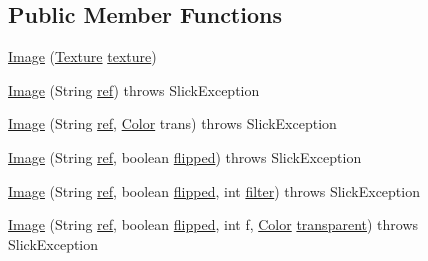 \subsection*{Public Member Functions}
\begin{DoxyCompactItemize}
\item 
\mbox{\hyperlink{classorg_1_1newdawn_1_1slick_1_1_image_a637c81c808dead29cf487b79445a4364}{Image}} (\mbox{\hyperlink{interfaceorg_1_1newdawn_1_1slick_1_1opengl_1_1_texture}{Texture}} \mbox{\hyperlink{classorg_1_1newdawn_1_1slick_1_1_image_a9fd9ddb21247305c83ac4e37d9d51f79}{texture}})
\item 
\mbox{\hyperlink{classorg_1_1newdawn_1_1slick_1_1_image_a9bf642123ace0c4086bf8f0ab15570af}{Image}} (String \mbox{\hyperlink{classorg_1_1newdawn_1_1slick_1_1_image_a32694687591a80299d8b8ad1ea070cee}{ref}})  throws Slick\+Exception  
\item 
\mbox{\hyperlink{classorg_1_1newdawn_1_1slick_1_1_image_a992a065fb27803ab47e948ab9a97f74c}{Image}} (String \mbox{\hyperlink{classorg_1_1newdawn_1_1slick_1_1_image_a32694687591a80299d8b8ad1ea070cee}{ref}}, \mbox{\hyperlink{classorg_1_1newdawn_1_1slick_1_1_color}{Color}} trans)  throws Slick\+Exception  
\item 
\mbox{\hyperlink{classorg_1_1newdawn_1_1slick_1_1_image_a1f744e6628b5b5942c4df4503f6e318e}{Image}} (String \mbox{\hyperlink{classorg_1_1newdawn_1_1slick_1_1_image_a32694687591a80299d8b8ad1ea070cee}{ref}}, boolean \mbox{\hyperlink{classorg_1_1newdawn_1_1slick_1_1_image_a45ebd330142d5ca956f6634158971ab0}{flipped}})  throws Slick\+Exception 
\item 
\mbox{\hyperlink{classorg_1_1newdawn_1_1slick_1_1_image_abbcffefeea17df0711246ed121fc2fec}{Image}} (String \mbox{\hyperlink{classorg_1_1newdawn_1_1slick_1_1_image_a32694687591a80299d8b8ad1ea070cee}{ref}}, boolean \mbox{\hyperlink{classorg_1_1newdawn_1_1slick_1_1_image_a45ebd330142d5ca956f6634158971ab0}{flipped}}, int \mbox{\hyperlink{classorg_1_1newdawn_1_1slick_1_1_image_a1c6f09687817420f3762f32bb1c3ed76}{filter}})  throws Slick\+Exception 
\item 
\mbox{\hyperlink{classorg_1_1newdawn_1_1slick_1_1_image_a9131d42fb7a781257c54f384b6ab4a12}{Image}} (String \mbox{\hyperlink{classorg_1_1newdawn_1_1slick_1_1_image_a32694687591a80299d8b8ad1ea070cee}{ref}}, boolean \mbox{\hyperlink{classorg_1_1newdawn_1_1slick_1_1_image_a45ebd330142d5ca956f6634158971ab0}{flipped}}, int f, \mbox{\hyperlink{classorg_1_1newdawn_1_1slick_1_1_color}{Color}} \mbox{\hyperlink{classorg_1_1newdawn_1_1slick_1_1_image_a3da3000703612fcb8595be3408c91757}{transparent}})  throws Slick\+Exception 

\end{DoxyCompactItemize}
